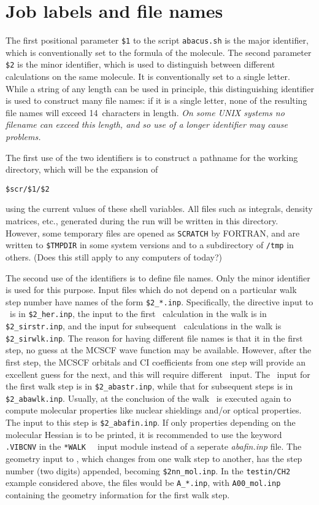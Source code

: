 \section{Job labels and file names}\label{sec:labscr}

The first positional parameter \verb|$1| to the script
\verb|abacus.sh| is the major identifier, which is conventionally
set to the formula of the molecule.  The second parameter
\verb|$2| is the minor identifier, which is used to distinguish
between different calculations on the same molecule.  It is
conventionally set to a single letter.  While a string of any
length can be used in principle, this distinguishing identifier is
used to construct many file names: if it is a single letter, none
of the resulting file names will exceed 14~characters in length.
{\em On some UNIX systems no filename can exceed this length, and so
use of a longer identifier may cause problems.}

The first use of the two identifiers is to construct a pathname
for the working directory, which will be the expansion of
\begin{verbatim}
$scr/$1/$2
\end{verbatim}
using the current values of these shell variables.  All files
such as integrals, density matrices, etc., generated
during the run will be written in this directory.  However, some
temporary files are opened as \verb|SCRATCH| by FORTRAN, and are
written to \verb|$TMPDIR| in some system versions and to a
subdirectory of \verb|/tmp| in others. (Does this still apply to any
computers of today?)

The second use of the identifiers is to define file names.  Only
the minor identifier is used for this purpose.  Input files which
do not depend on a particular walk step number have names of the
form \verb|$2_*.inp|.  Specifically, the directive input to \her\
is in \verb|$2_her.inp|, the input to the first \sir\ calculation
in the walk is in \verb|$2_sirstr.inp|, and the input for
subsequent \sir\ calculations in the walk is \verb|$2_sirwlk.inp|.
The reason for having different file names is that it in the first
step, no guess at the MCSCF wave function may be available.
However, after the first step, the MCSCF orbitals and CI
coefficients from one step will provide an excellent guess for the
next, and this will require different \sir\ input.  The \aba\
input for the first walk step is in \verb|$2_abastr.inp|, while
that for subsequent steps is in \verb|$2_abawlk.inp|.  Usually, at
the conclusion of the walk \aba\ is executed again to compute
molecular properties like nuclear shieldings and/or optical
properties. The input to this step is \verb|$2_abafin.inp|. If only
properties depending on the molecular Hessian is 
to be printed, it is recommended to use the keyword \verb|.VIBCNV| in
the \verb|*WALK  | input module instead of a seperate {\em abafin.inp}
file. 
The geometry input to \her, which changes from
one walk step to another, has the step number (two digits)
appended, becoming \verb|$2nn_mol.inp|.  In the \verb|testin/CH2|
example considered above, the files would be \verb|A_*.inp|, with
\verb|A00_mol.inp| containing the geometry information for the
first walk step.

